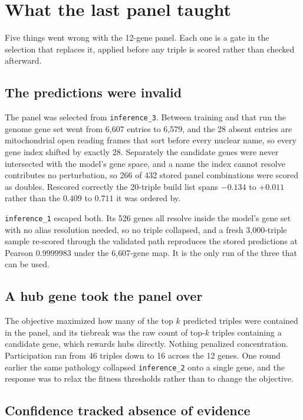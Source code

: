 \section{What the last panel taught}

Five things went wrong with the 12-gene panel. Each one is a gate in the
selection that replaces it, applied before any triple is scored rather than
checked afterward.

\subsection{The predictions were invalid}

The panel was selected from \texttt{inference\_3}. Between training and that run
the genome gene set went from 6{,}607 entries to 6{,}579, and the 28 absent
entries are mitochondrial open reading frames that sort before every nuclear
name, so every gene index shifted by exactly 28. Separately the candidate genes
were never intersected with the model's gene space, and a name the index cannot
resolve contributes no perturbation, so 266 of 432 stored panel combinations were
scored as doubles. Rescored correctly the 20-triple build list spans $-0.134$ to
$+0.011$ rather than the $0.409$ to $0.711$ it was ordered by.

\texttt{inference\_1} escaped both. Its 526 genes all resolve inside the model's
gene set with no alias resolution needed, so no triple collapsed, and a fresh
3{,}000-triple sample re-scored through the validated path reproduces the stored
predictions at Pearson $0.9999983$ under the 6{,}607-gene map. It is the only run
of the three that can be used.

\subsection{A hub gene took the panel over}

The objective maximized how many of the top $k$ predicted triples were contained
in the panel, and its tiebreak was the raw count of top-$k$ triples containing a
candidate gene, which rewards hubs directly. Nothing penalized concentration.
Participation ran from 46 triples down to 16 across the 12 genes. One round
earlier the same pathology collapsed \texttt{inference\_2} onto a single gene,
and the response was to relax the fitness thresholds rather than to change the
objective.

\subsection{Confidence tracked absence of evidence}

